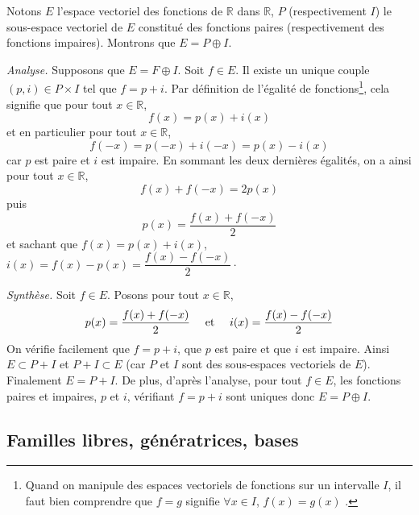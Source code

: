 \documentclass[a4paper,twoside,french,11pt]{VcCours}
\begin{document}
\begin{Exercice}{}\end{Exercice}Notons $E$ l'espace vectoriel des fonctions de $\mathbb{R}$ dans $\mathbb{R}$, $P$ (respectivement $I$) le sous-espace vectoriel de $E$ constitué des fonctions paires (respectivement des fonctions impaires). Montrons que $E= P \oplus I$.



\noindent \textit{Analyse.} Supposons que $E= F \oplus I$. Soit $f \in E$. Il existe un unique couple $(p,i) \in P \times I$ tel que $f=p + i$. Par définition de l'égalité de fonctions\footnote{Quand on manipule des espaces vectoriels de fonctions sur un intervalle $I$, il faut bien comprendre que $f=g$ signifie \og $\forall x \in I$, $f(x)=g(x)$ \fg.}, cela signifie que pour tout $x \in \mathbb{R}$,
$$ f(x) = p(x)+i(x)$$
et en particulier pour tout $x \in \mathbb{R}$,
$$ f(-x) = p(-x)+i(-x) = p(x)-i(x)$$
car $p$ est paire et $i$ est impaire. En sommant les deux dernières égalités, on a ainsi pour tout $x \in \mathbb{R}$,
$$ f(x)+f(-x) = 2p(x) $$
puis
$$ p(x) = \frac{f(x)+f(-x)}{2}$$
et sachant que $f(x)=p(x)+i(x)$, $i(x)=f(x)-p(x) = \dfrac{f(x)-f(-x)}{2}\cdot$



\noindent \textit{Synthèse.} Soit $f \in E$. Posons pour tout $x \in \mathbb{R}$,
$$ p(x) = \frac{f(x)+f(-x)}{2} \quad \hbox{ et } \quad i(x) = \frac{f(x)-f(-x)}{2} $$
On vérifie facilement que $f=p+i$, que $p$ est paire et que $i$ est impaire. Ainsi $E \subset P + I$ et $P + I \subset E$ (car $P$ et $I$ sont des sous-espaces vectoriels de $E$). Finalement $E=P+I$. De plus, d'après l'analyse, pour tout $f \in E$, les fonctions paires et impaires, $p$ et $i$, vérifiant $f=p+i$ sont uniques donc $E = P \oplus I$.

\subsection{Familles libres, génératrices, bases}

\begin{Exercice}{}\end{Exercice}
\end{document}
